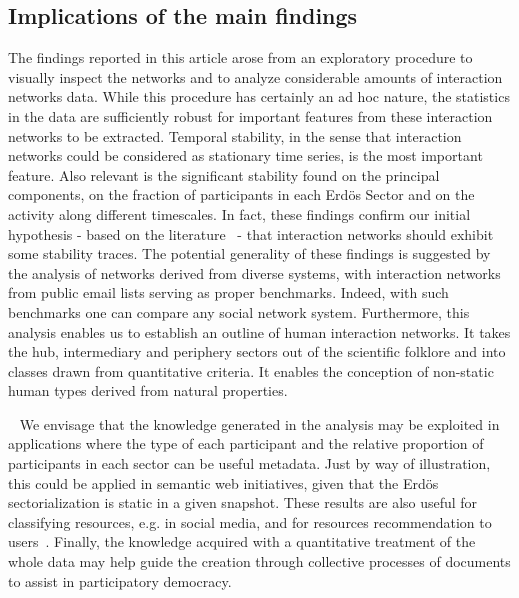
\subsection{Implications of the main findings}\label{sec:impl}
The findings reported in this article arose from an exploratory procedure to visually inspect the networks and to analyze considerable amounts of interaction networks data.
While this procedure has certainly an ad hoc nature, the statistics in the data are sufficiently robust for important features from these interaction networks to be extracted.
Temporal stability, in the sense that interaction networks could be considered as stationary time series, is the most important feature. Also relevant is the significant stability found on the principal components, on the fraction of participants in each Erd\"os Sector and on the activity along different timescales. In fact, these findings confirm our initial hypothesis - based on the literature~\cite{newmanBook} - that interaction networks should exhibit some stability traces. The potential generality of these findings is suggested by the analysis of networks derived from diverse systems, with interaction networks from public email lists serving as proper benchmarks. Indeed, with such benchmarks one can compare any social network system. Furthermore, this analysis enables us to establish an outline of human interaction networks. It takes the hub, intermediary and periphery sectors out of the scientific folklore and into classes drawn from quantitative criteria. It enables the conception of non-static human types derived from natural properties.

 
We envisage that the knowledge generated in the analysis may be exploited in applications where the type of each participant and the relative proportion of participants in each sector can be useful metadata. Just by way of illustration, this could be applied in semantic web initiatives, given that the Erd\"os sectorialization is static in a given snapshot. These results are also useful for classifying resources, e.g. in social media, and for resources recommendation to users~\cite{opa}. 
Finally, the knowledge acquired with a quantitative treatment of the whole data may help guide the creation through collective processes of documents to assist in participatory democracy.

